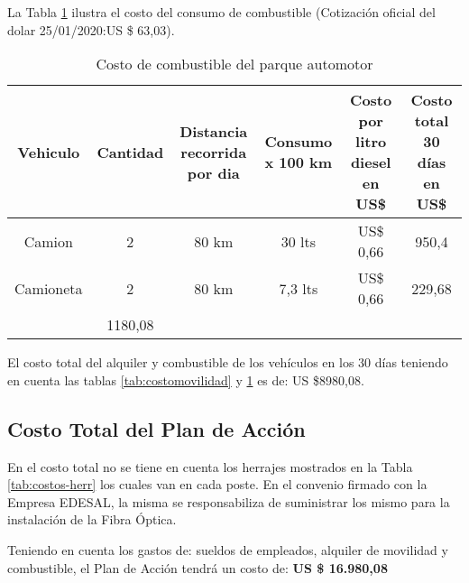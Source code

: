 La Tabla \ref{tab:costocombus} ilustra el costo del consumo de combustible (Cotización oficial del dolar 25/01/2020:US \$ 63,03).


\begin{table}[H]
  \centering
  \tiny
    \begin{tabular}{|c|c|c|c|c|c|}
    \hline
    \rowcolor[rgb]{ .773,  .851,  .945} \textbf{Vehiculo} & \textbf{Cantidad} & \textbf{Distancia recorrida por dia} & \textbf{Consumo x 100 km} & \textbf{Costo por litro diesel en US\$} & \textbf{Costo total 30 días en US\$} \bigstrut\\
    \hline
    Camion & 2     & 80 km & 30 lts & US\$ 0,66 & 950,4 \bigstrut\\
    \hline
    Camioneta & 2     & 80 km & 7,3 lts & US\$ 0,66 & 229,68 \bigstrut\\
    \hline
    \rowcolor[rgb]{ .773,  .851,  .945} \multicolumn{5}{|c|}{\textbf{Total}}  & \cellcolor[rgb]{ 1,  1,  1}1180,08 \bigstrut\\
    \hline
    \end{tabular}%
  \caption{Costo de combustible del parque automotor}
  \label{tab:costocombus}%
\end{table}%








El costo total del alquiler y combustible de los vehículos   en los 30 días teniendo en cuenta las tablas \ref{tab:costomovilidad} y \ref{tab:costocombus} es de: US \$8980,08.


\subsection{Costo Total del Plan de Acción}



En el costo total no se tiene en cuenta los herrajes mostrados en la Tabla \ref{tab:costos-herr} los cuales van en cada poste. En el convenio firmado con la Empresa EDESAL, la misma se responsabiliza de suministrar los mismo para la instalación de la Fibra Óptica. 

Teniendo en cuenta los gastos de: sueldos de empleados, alquiler de movilidad y combustible, el Plan de Acción tendrá un costo de: \textbf{US \$ 16.980,08}

\newpage




